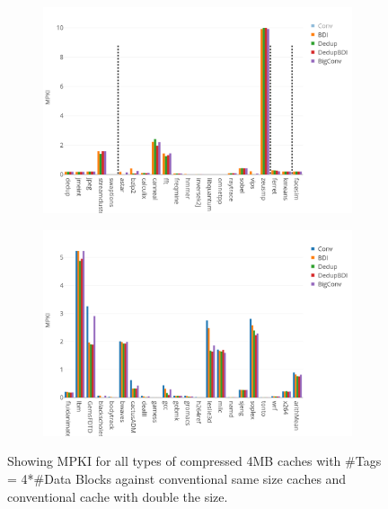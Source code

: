 \begin{figure}
    \begin{subfigure}{\textwidth}
        \includegraphics[width=\textwidth]{all4-mpki1.png}
    \end{subfigure}
    \begin{subfigure}{\textwidth}
        \includegraphics[width=\textwidth]{all4-mpki2.png}
    \end{subfigure}
    \caption[All benchmarks: 4MB MPKI]{Showing MPKI for all types of compressed 4MB caches with \#Tags = 4*\#Data Blocks against conventional same size caches and conventional cache with double the size.}
    \label{fig:all_mpki}
\end{figure}
